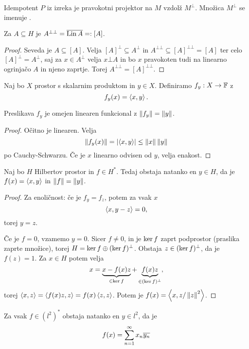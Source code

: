 Idempotent $P$ iz izreka je pravokotni projektor na $M$ vzdolž $M^\bot$.
Množica $M^\bot$ se imenuje .

\begin{posledica}
  Za $A \subseteq H$ je $A^{\bot \bot} = \overline{\operatorname{Lin} A} =: [A]$.
\end{posledica}

\begin{proof}
  Seveda je $A \subseteq [A]$.
  Velja $[A]^\bot \subseteq A^\bot$ in $A^{\bot \bot} \subseteq [A]^{\bot \bot}
  = [A]$ ter celo $[A]^\bot = A^\bot$, saj za $x \in A^\bot$ velja $x \bot A$
  in bo $x$ pravokoten tudi na linearno ogrinjačo $A$ in njeno zaprtje.
  Torej $A^{\bot \bot} = [A]^{\bot \bot}$.
\end{proof}

Naj bo $X$ prostor s skalarnim produktom in $y \in X$.
Definiramo $f_y: X \to \mathbb{F}$ z
\[
  f_y(x) = \left< x,y \right>.
\]

\begin{lema}
  Preslikava $f_y$ je omejen linearen funkcional z $\left\lVert f_y\right\rVert = \left\lVert y\right\rVert$.
\end{lema}

\begin{proof}
  Očitno je linearen.
  Velja
  \[
	\left\lVert f_y(x)\right\rVert = \left| \left< x,y \right> \right| \le \left\lVert x\right\rVert \left\lVert y\right\rVert
  \]
  po Cauchy-Schwarzu.
  Če je $x$ linearno odvisen od $y$, velja enakost.
\end{proof}

\begin{izrek}[Riesz]
  Naj bo $H$ Hilbertov prostor in $f \in H^*$.
  Tedaj obstaja natanko en $y \in H$, da je $f(x) =\left< x,y \right>$ in $\left\lVert f\right\rVert =
  \left\lVert y\right\rVert$.
\end{izrek}

\begin{proof}
  Za enoličnost: če je $f_y = f_z$, potem za vsak $x$
  \[
	\left< x, y-z \right> = 0,
  \]
  torej $y = z$.

  Če je $f = 0$, vzamemo $y = 0$.
  Sicer $f \ne 0$, in je $\operatorname{ker} f$ zaprt podprostor (praslika zaprte množice),
  torej $H = \operatorname{ker} f \oplus (\operatorname{ker} f)^\bot$.
  Obstaja $z \in (\operatorname{ker} f)^\bot$, da je $f(z) = 1$.
  Za $x \in H$ potem velja
  \[
	x = \underbrace{x - f(x) z}_{\in \operatorname{ker} f} + \underbrace{f(x) z}_{\in
	  (\operatorname{ker} f)^\bot},
  \]
  torej $\left< x,z \right> = \left< f(x) z, z \right> = f(x) \left< z,z \right>$.
  Potem je $f(x) = \left< x, z / \left\lVert z\right\rVert^2 \right>$.
\end{proof}

\begin{posledica}
  Za vsak $f \in (l^2)^*$ obstaja natanko en $y \in l^2$, da je
  \[
	f(x) = \sum_{n=1}^\infty x_n \overline{y_n}
  \]
\end{posledica}

